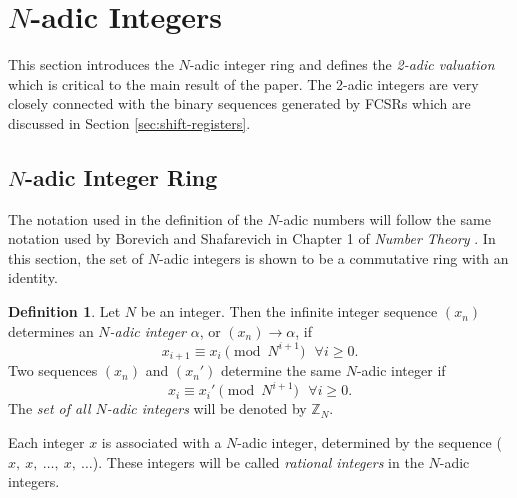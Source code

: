 \documentclass[english]{article}
\def\zzzn{\mathbb{Z}_N}
\def\xn{(x_n)}
\theoremstyle{plain}
\theoremstyle{definition}
\newtheorem{definition}[theorem]{Definition}%
\theoremstyle{remark}
\begin{document}
\section{$N$-adic Integers}\label{sec:n-adic-ring}
\par This section introduces the $N$-adic integer ring and defines the
{\em 2-adic valuation} which is critical to the main result of the paper. The
2-adic integers are very closely connected with the binary sequences generated
by FCSRs which are discussed in Section \ref{sec:shift-registers}.

\subsection{$N$-adic Integer Ring}
\par The notation used in the definition of the $N$-adic numbers will follow
the same notation used by Borevich and Shafarevich in Chapter 1 of
{\em Number Theory} \cite{bk:bs66}. In this section, the set of $N$-adic
integers is shown to be a commutative ring with an identity.
  
\begin{definition}
\label{def:N-adic}
  Let $N$ be an integer. Then the infinite integer sequence $\xn$
  determines an {\em $N$-adic integer} $\alpha$, or
  $\xn \rightarrow \alpha$, if
  \begin{equation} \label{eq:seq}
  x_{i+1} \equiv x_i\pmod{N^{i+1}} \ \ \ \forall i \geq 0.
  \end{equation}
  Two sequences $\xn$ and $(x_n')$ determine the same $N$-adic integer if 
\begin{equation} \label{eq:equiv}
  x_i \equiv x_i' \pmod{N^{i+1}}\ \ \ \forall i \geq 0.
\end{equation}
  The {\em set of all $N$-adic integers} will be denoted by $\zzzn$.
\end{definition}

\par Each integer $x$ is associated with a $N$-adic integer, determined
by the sequence ($x,\ x, \ \dots, \ x,\ \dots$). These integers will be
called {\em rational integers} in the $N$-adic integers.
  
\end{document}
